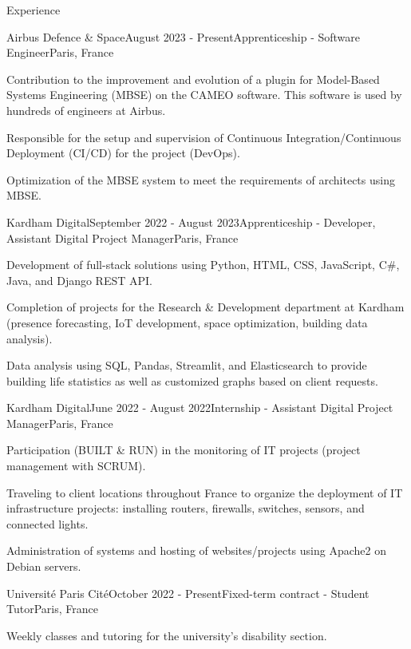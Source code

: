 \documentclass[
	10pt,
]{style} %
\begin{document}
\begin{rSection}{Experience}

	\begin{rSubsection}{Airbus Defence \& Space}{August 2023 - Present}{Apprenticeship - Software Engineer}{Paris, France}
		\item Contribution to the improvement and evolution of a plugin for Model-Based Systems Engineering (MBSE) on the CAMEO software. This software is used by hundreds of engineers at Airbus.
		\item Responsible for the setup and supervision of Continuous Integration/Continuous Deployment (CI/CD) for the project (DevOps).
		\item Optimization of the MBSE system to meet the requirements of architects using MBSE.
	\end{rSubsection}


	\begin{rSubsection}{Kardham Digital}{September 2022 - August 2023}{Apprenticeship - Developer, Assistant Digital Project Manager}{Paris, France}
		\item Development of full-stack solutions using Python, HTML, CSS, JavaScript, C\#, Java, and Django REST API.
		\item Completion of projects for the Research \& Development department at Kardham (presence forecasting, IoT development, space optimization, building data analysis).
		\item Data analysis using SQL, Pandas, Streamlit, and Elasticsearch to provide building life statistics as well as customized graphs based on client requests.
	\end{rSubsection}


	\begin{rSubsection}{Kardham Digital}{June 2022 - August 2022}{Internship - Assistant Digital Project Manager}{Paris, France}
		\item Participation (BUILT \& RUN) in the monitoring of IT projects (project management with SCRUM).
		\item Traveling to client locations throughout France to organize the deployment of IT infrastructure projects: installing routers, firewalls, switches, sensors, and connected lights.
		\item Administration of systems and hosting of websites/projects using Apache2 on Debian servers.
	\end{rSubsection}


	\begin{rSubsection}{Université Paris Cité}{October 2022 - Present}{Fixed-term contract - Student Tutor}{Paris, France}
		\item Weekly classes and tutoring for the university's disability section.
	\end{rSubsection}

\end{rSection}
\end{document}
